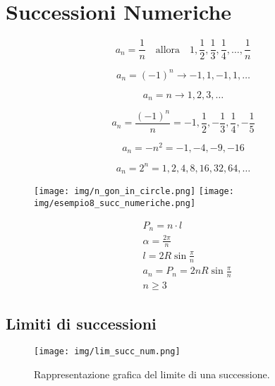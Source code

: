 \chapter{Successioni Numeriche}\label{successioni-numeriche}


\[
a_{n}=\frac{1}{n} \quad \text{allora} \quad1, \frac{1}{2}, \frac{1}{3}, \frac{1}{4},\dots, \frac{1}{n}
\]

\[
a_{n}=(-1)^n \to -1,1,-1,1,\dots
\]

\[
a_n =n \to 1,2,3,\dots
\]

\[
a_{n}=\frac{(-1)^n}{n}=-1, \frac{1}{2}, -\frac{1}{3}, \frac{1}{4}, -\frac{1}{5}
\]

\[
a_{n}=-n^2=-1,-4,-9,-16
\]


\[
a_{n}=2^n=1,2,4,8,16,32,64,\dots
\]

\begin{figure}[H]
    \centering
    \texttt{[image: img/n\_gon\_in\_circle.png]}%
    \texttt{[image: img/esempio8\_succ\_numeriche.png]}
\end{figure}
\[
\begin{aligned}
&P_{n}=n \cdot l\\
&\alpha = \frac{2\pi}{n} \\
&l=2R\sin \frac{\pi}{n} \\
&\boxed{a_{n}=P_{n}=2nR\sin \frac{\pi}{n}} \\
&n\geq3
\end{aligned}
\]

\section{Limiti di successioni}\label{limiti-di-successioni}
\begin{figure}[H]
    \centering
    \texttt{[image: img/lim\_succ\_num.png]}
    \caption{Rappresentazione grafica del limite di una successione.}
\end{figure}


